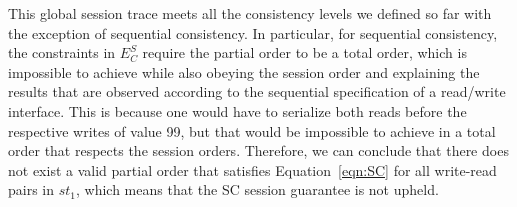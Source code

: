 \documentclass[conference]{IEEEtran}
\begin{document}
	This global session trace meets all the consistency levels we defined so far with the exception of sequential consistency.
	In particular, for sequential consistency, the constraints in $E^S_C$ require the partial order to be a total order, which is impossible to achieve while also obeying the session order and explaining the results that are observed according to the sequential specification of a read/write interface. This is because one would have to serialize both reads before the respective writes of value 99, but that would be impossible to achieve in a total order that respects the session orders.
	Therefore, we can conclude that there does not exist a valid partial order that satisfies Equation~\ref{eqn:SC} for all write-read pairs in $\mathit{st}_1$, which means that the SC session guarantee is not upheld.
\end{document}
